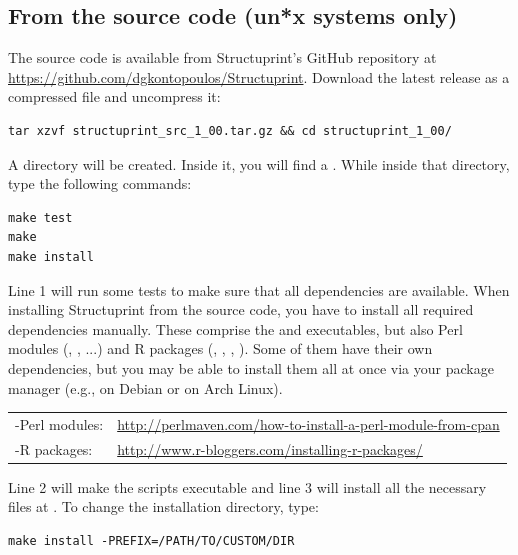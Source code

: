\documentclass[12pt,a4paper]{article}
\begin{document}
\subsection{From the source code (un*x systems only)}
The source code is available from Structuprint's GitHub repository at 
\url{https://github.com/dgkontopoulos/Structuprint}. Download the 
latest release as a compressed file and uncompress it:
\begin{lstlisting}[numbers=none]
tar xzvf structuprint_src_1_00.tar.gz && cd structuprint_1_00/
\end{lstlisting}

A  directory will be created. Inside it, you 
will find a . While inside that directory, type the 
following commands:
\begin{lstlisting}
make test
make
make install
\end{lstlisting}
Line 1 will run some tests to make sure that all dependencies are available. 
When installing Structuprint from the source code, you have to install all 
required dependencies manually. These comprise the  and  
executables, but also Perl modules (, 
,  ...) and R packages 
(, , , ). Some of them have 
their own dependencies, but you may be able to install them all at once 
via your package manager (e.g.,  on Debian or  
on Arch Linux).\\

\begin{myboxii}
\begin{tabular}{ll}
-Perl modules: & \url{http://perlmaven.com/how-to-install-a-perl-module-from-cpan}\\
-R packages: & \url{http://www.r-bloggers.com/installing-r-packages/}
\end{tabular}
\end{myboxii}

\vspace{0.5cm}

Line 2 will make the scripts executable and line 3 will install all the 
necessary files at . To change the installation 
directory, type:
\begin{lstlisting}[numbers=none]
make install -PREFIX=/PATH/TO/CUSTOM/DIR
\end{lstlisting}
\end{document}
